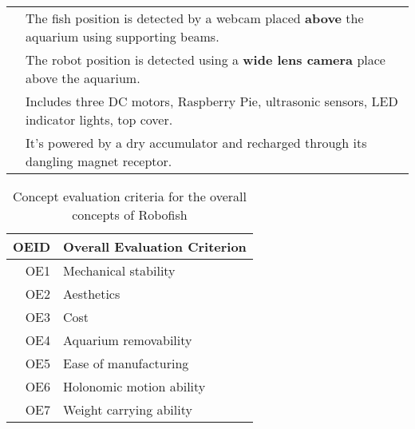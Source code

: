 \documentclass[a4paper, 10pt, DIV=16, parskip = full, twocolumn = true]{scrartcl}
\begin{document}
\begin{table*}
\begin{tabular}{rl}
		& The fish position is detected by a webcam placed \textbf{above} the aquarium using supporting beams. \\
		& The robot position is detected using a \textbf{wide lens camera} place above the aquarium. \\
		& Includes three DC motors, Raspberry Pie, ultrasonic sensors, LED indicator lights, top cover. \\
		& It's powered by a dry accumulator and recharged through its dangling magnet receptor.\\
	\bottomrule	
	\end{tabular}
\label{table:concepts}
\end{table*}

\begin{table*}
	\centering
	\caption{Concept evaluation criteria for the overall concepts of Robofish}
	\begin{tabular}{rl}
		\toprule
		OEID & Overall Evaluation Criterion \\
		\midrule
		OE1 & Mechanical stability \\
		OE2 & Aesthetics \\	
		OE3 & Cost \\	
		OE4 & Aquarium removability \\		
		OE5 & Ease of manufacturing \\	
		OE6 & Holonomic motion ability \\
		OE7 & Weight carrying ability\\	
		\bottomrule
	\end{tabular}
\label{table:criterion}
\end{table*}

\end{document}
